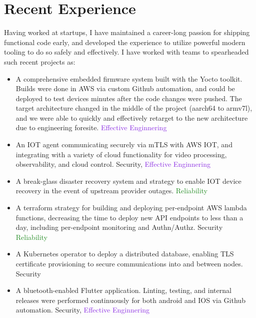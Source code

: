 \documentclass[letterpaper,11pt]{article}
\begin{document}
\section{Recent Experience}
Having worked at startups, I have maintained a
career-long passion for shipping functional code early, and developed the experience to
utilize powerful modern tooling to do so safely and effectively. I have
worked with teams to spearheaded such recent projects as:
\begin{itemize}
	\item A comprehensive embedded firmware system built with the Yocto toolkit. Builds were done in AWS via custom Github automation, and could be deployed to test devices minutes after the code changes were pushed. The target architecture
	      changed in the middle of the project (aarch64 to armv7l), and we were able to quickly and effectively retarget to the new architecture due to engineering foresite. \textcolor{BlueViolet}{Effective Enginnering}
	\item An IOT agent communicating securely via mTLS with AWS IOT, and integrating with a variety of cloud functionality for video processing, observability, and cloud control. \textcolor{BrickRed}{Security}, \textcolor{BlueViolet}{Effective Enginnering}
	\item A break-glass disaster recovery system and strategy to enable IOT device recovery in the event of upstream provider outages. \textcolor{ForestGreen}{Reliability}
	\item A terraform strategy for building and deploying per-endpoint AWS lambda functions, decreasing the time to deploy new API endpoints to less than a day, including per-endpoint monitoring and Authn/Authz. \textcolor{BrickRed}{Security} \textcolor{ForestGreen}{Reliability}
	\item A Kubernetes operator to deploy a distributed database, enabling TLS certificate provisioning to secure communications into and between nodes. \textcolor{BrickRed}{Security}
	\item A bluetooth-enabled Flutter application. Linting, testing, and internal releases were performed continuously for both android and IOS via Github automation. \textcolor{BrickRed}{Security}, \textcolor{BlueViolet}{Effective Enginnering}
\end{itemize}
\end{document}
